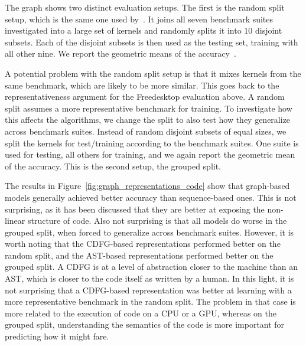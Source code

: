 The graph shows two distinct evaluation setups.
The first is the random split setup, which is the same one used by~\cite{cummins_pact17,benun_neurips18}.
It joins all seven benchmark suites investigated into a large set of kernels and randomly splits it into $10$ disjoint subsets.
Each of the disjoint subsets is then used as the testing set, training with all other nine.
We report the geometric means of the accuracy~\cite{fleming1986gmean}.

A potential problem with the random split setup is that it mixes kernels from the same benchmark, which are likely to be more similar. 
This goes back to the representativeness argument for the Freedesktop evaluation above.
A random split assumes a more representative benchmark for training.
To investigate how this affects the algorithms, we change the split to also test how they generalize across benchmark suites.
Instead of random disjoint subsets of equal sizes, we split the kernels for test/training according to the benchmark suites.
One suite is used for testing, all others for training, and we again report the geometric mean of the accuracy.
This is the second setup, the grouped split.

The results in Figure~\ref{fig:graph_representations_code} show that graph-based models generally achieved better accuracy than sequence-based ones.
This is not surprising, as it has been discussed that they are better at exposing the non-linear structure of code.
Also not surprising is that all models do worse in the grouped split, when forced to generalize across benchmark suites.
However, it is worth noting that the \ac{CDFG}-based representations performed better on the random split, and the \ac{AST}-based representations performed better on the grouped split.
A \ac{CDFG} is at a level of abstraction closer to the machine than an \ac{AST}, which is closer to the code itself as written by a human.
In this light, it is not surprising that a \ac{CDFG}-based representation was better at learning with a more representative benchmark in the random split.
The problem in that case is more related to the execution of code on a \ac{CPU} or a \ac{GPU}, whereas on the grouped split, understanding the semantics of the code is more important for predicting how it might fare.


